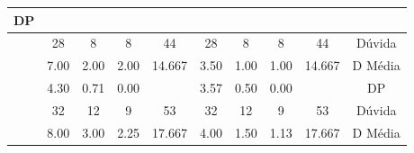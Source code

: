 \begin{table}[htbp]
\begin{tabular}{|cccccccccc}
		\multicolumn{1}{c|}{DP} \\ \hline
		\rowcolor[HTML]{D9D9D9} 
		\multicolumn{1}{|c|}{\cellcolor[HTML]{F2F2F2}} &
		\multicolumn{1}{c|}{\cellcolor[HTML]{D9D9D9}28} &
		\multicolumn{1}{c|}{\cellcolor[HTML]{D9D9D9}8} &
		\multicolumn{1}{c|}{\cellcolor[HTML]{D9D9D9}8} &
		\multicolumn{1}{c|}{\cellcolor[HTML]{D9D9D9}44} &
		\multicolumn{1}{c|}{\cellcolor[HTML]{D9D9D9}28} &
		\multicolumn{1}{c|}{\cellcolor[HTML]{D9D9D9}8} &
		\multicolumn{1}{c|}{\cellcolor[HTML]{D9D9D9}8} &
		\multicolumn{1}{c|}{\cellcolor[HTML]{D9D9D9}44} &
		\multicolumn{1}{c|}{\cellcolor[HTML]{D9D9D9}Dúvida} \\ \cline{2-10} 
		\multicolumn{1}{|c|}{\cellcolor[HTML]{F2F2F2}} &
		\multicolumn{1}{c|}{7.00} &
		\multicolumn{1}{c|}{2.00} &
		\multicolumn{1}{c|}{2.00} &
		\multicolumn{1}{c|}{14.667} &
		\multicolumn{1}{c|}{3.50} &
		\multicolumn{1}{c|}{1.00} &
		\multicolumn{1}{c|}{1.00} &
		\multicolumn{1}{c|}{14.667} &
		\multicolumn{1}{c|}{D Média} \\ \cline{2-10} 
		\rowcolor[HTML]{D9D9D9} 
		\multicolumn{1}{|c|}{\multirow{-3}{*}{\cellcolor[HTML]{F2F2F2}\textbf{T03}}} &
		\multicolumn{1}{c|}{\cellcolor[HTML]{D9D9D9}4.30} &
		\multicolumn{1}{c|}{\cellcolor[HTML]{D9D9D9}0.71} &
		\multicolumn{1}{c|}{\cellcolor[HTML]{D9D9D9}0.00} &
		\multicolumn{1}{c|}{\cellcolor[HTML]{D9D9D9}} &
		\multicolumn{1}{c|}{\cellcolor[HTML]{D9D9D9}3.57} &
		\multicolumn{1}{c|}{\cellcolor[HTML]{D9D9D9}0.50} &
		\multicolumn{1}{c|}{\cellcolor[HTML]{D9D9D9}0.00} &
		\multicolumn{1}{c|}{\cellcolor[HTML]{D9D9D9}} &
		\multicolumn{1}{c|}{\cellcolor[HTML]{D9D9D9}DP} \\ \hline
		\multicolumn{1}{|c|}{\cellcolor[HTML]{F2F2F2}} &
		\multicolumn{1}{c|}{32} &
		\multicolumn{1}{c|}{12} &
		\multicolumn{1}{c|}{9} &
		\multicolumn{1}{c|}{53} &
		\multicolumn{1}{c|}{32} &
		\multicolumn{1}{c|}{12} &
		\multicolumn{1}{c|}{9} &
		\multicolumn{1}{c|}{53} &
		\multicolumn{1}{c|}{Dúvida} \\ \cline{2-10} 
		\rowcolor[HTML]{D9D9D9} 
		\multicolumn{1}{|c|}{\cellcolor[HTML]{F2F2F2}} &
		\multicolumn{1}{c|}{\cellcolor[HTML]{D9D9D9}8.00} &
		\multicolumn{1}{c|}{\cellcolor[HTML]{D9D9D9}3.00} &
		\multicolumn{1}{c|}{\cellcolor[HTML]{D9D9D9}2.25} &
		\multicolumn{1}{c|}{\cellcolor[HTML]{D9D9D9}17.667} &
		\multicolumn{1}{c|}{\cellcolor[HTML]{D9D9D9}4.00} &
		\multicolumn{1}{c|}{\cellcolor[HTML]{D9D9D9}1.50} &
		\multicolumn{1}{c|}{\cellcolor[HTML]{D9D9D9}1.13} &
		\multicolumn{1}{c|}{\cellcolor[HTML]{D9D9D9}17.667} &
		\multicolumn{1}{c|}{\cellcolor[HTML]{D9D9D9}D Média} \\ \cline{2-10} 

\end{tabular}
\end{table}
